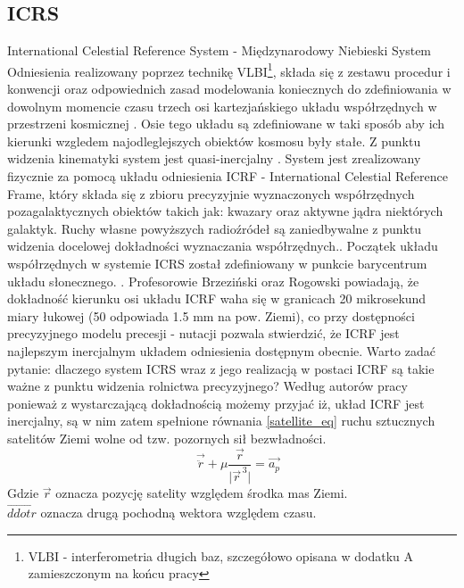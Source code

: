 	\subsection{ICRS}
International Celestial Reference System - Międzynarodowy Niebieski System Odniesienia realizowany poprzez technikę VLBI\footnote{VLBI - interferometria długich baz,
szczegółowo opisana w dodatku A zamieszczonym na końcu pracy}, 
składa się z zestawu procedur i konwencji oraz odpowiednich zasad modelowania koniecznych do zdefiniowania w dowolnym momencie czasu trzech osi kartezjańskiego 
układu współrzędnych w przestrzeni kosmicznej \cite{IERS_ICRS}. Osie tego układu są zdefiniowane w taki sposób aby ich kierunki wzgledem najodleglejszych obiektów 
kosmosu były stałe. Z punktu widzenia kinematyki system jest quasi-inercjalny \cite[][strona 23]{KRYNSKI_SYSTEMY}.
System jest zrealizowany fizycznie za pomocą układu odniesienia ICRF - International Celestial Reference Frame, który składa się z zbioru precyzyjnie
wyznaczonych współrzędnych pozagalaktycznych obiektów takich jak: kwazary oraz aktywne jądra niektórych galaktyk.
Ruchy własne powyższych radioźródeł są zaniedbywalne z punktu widzenia docelowej dokładności wyznaczania współrzędnych.\cite[][strona 21]{IERS_2010}.
Początek układu współrzędnych w systemie ICRS został zdefiniowany w punkcie barycentrum układu słonecznego. \cite[][strona 163]{BRZEZINSKI_2012}.
Profesorowie Brzeziński oraz Rogowski powiadają, że dokładność kierunku osi układu ICRF waha się w granicach 20 mikrosekund miary łukowej
(50 odpowiada 1.5 mm na pow. Ziemi), co przy dostępności 
precyzyjnego modelu precesji - nutacji pozwala stwierdzić, że ICRF jest najlepszym inercjalnym układem odniesienia dostępnym obecnie\cite[][strona 164]{BRZEZINSKI_2012}.
Warto zadać pytanie: dlaczego system ICRS wraz z jego realizacją w postaci ICRF są takie ważne z punktu widzenia rolnictwa precyzyjnego?
Według autorów pracy \cite[][strona 164]{BRZEZINSKI_2012} ponieważ z wystarczającą dokładnością możemy przyjać iż, układ ICRF jest inercjalny, 
są w nim zatem spełnione równania \ref{satellite_eq} ruchu sztucznych satelitów Ziemi wolne od tzw. pozornych sił bezwładności.
\begin{equation} \label{satellite_eq}
\quad \vec{ \ddot{r} } + \mu \frac{ \vec{r} } { \lvert { \vec{r} }^{\,3} \rvert } = \vec{a_p}
\end{equation} 
Gdzie $ \vec{r} $ oznacza pozycję satelity względem środka mas Ziemi.\\
$\vec{ddot{r}}$ oznacza drugą pochodną wektora względem czasu.\\
